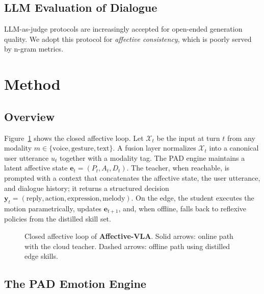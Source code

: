 \documentclass{article}
\newcommand{\cX}{\mathcal{X}}
\newcommand{\method}{\textbf{Affective-VLA}}
\theoremstyle{definition}
\begin{document}
\subsection{LLM Evaluation of Dialogue}
LLM-as-judge protocols \cite{zheng2023judging} are increasingly accepted for
open-ended generation quality. We adopt this protocol for \emph{affective
consistency}, which is poorly served by n-gram metrics.

\section{Method}

\subsection{Overview}

Figure~\ref{fig:pipeline} shows the closed affective loop. Let
$\cX_t$ be the input at turn $t$ from any modality $m \in
\{\text{voice},\text{gesture},\text{text}\}$. A fusion layer normalizes $\cX_t$
into a canonical user utterance $u_t$ together with a modality tag. The PAD
engine maintains a latent affective state $\mathbf{e}_t = (P_t,A_t,D_t)$. The
teacher, when reachable, is prompted with a context that concatenates the
affective state, the user utterance, and dialogue history; it returns a
structured decision $\mathbf{y}_t = (\text{reply}, \text{action},
\text{expression}, \text{melody})$. On the edge, the student executes the motion
parametrically, updates $\mathbf{e}_{t+1}$, and, when offline, falls back to
reflexive policies from the distilled skill set.

\begin{figure}[t]
\centering
{}
\caption{Closed affective loop of \method{}. Solid arrows: online path with the
cloud teacher. Dashed arrows: offline path using distilled edge skills.}
\label{fig:pipeline}
\end{figure}

\subsection{The PAD Emotion Engine}
\end{document}
